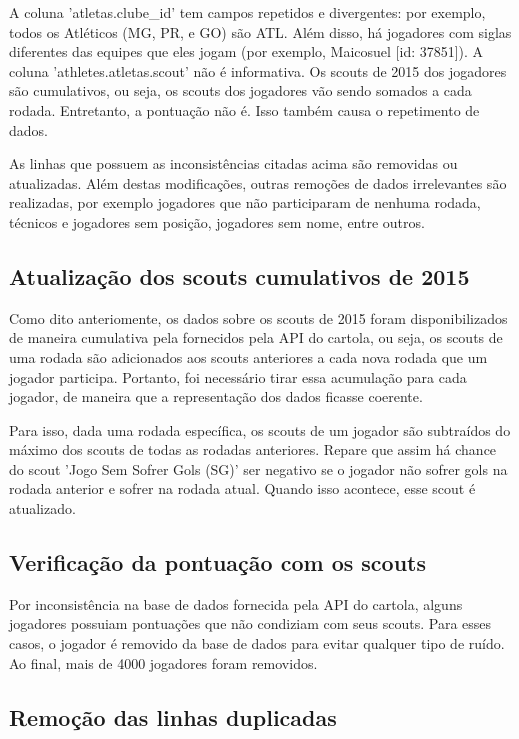\documentclass[conference]{IEEEtran}
\begin{document}
A coluna  'atletas.clube\_id' tem campos repetidos  e divergentes: por
exemplo, todos os Atléticos (MG, PR, e GO) são ATL. Além disso, há
jogadores  com  siglas diferentes  das  equipes  que eles  jogam  (por
exemplo,  Maicosuel [id:  37851]).  A coluna  'athletes.atletas.scout'
não é informativa. Os scouts de 2015 dos jogadores são cumulativos,
ou seja,  os scouts dos  jogadores vão  sendo somados a  cada rodada.
Entretanto, a pontuação não é. Isso também causa o repetimento de
dados.

As linhas que possuem as inconsistências citadas acima são removidas
ou  atualizadas. Além  destas  modificações,  outras remoções  de
dados  irrelevantes são  realizadas, por  exemplo jogadores  que não
participaram de  nenhuma rodada, técnicos e  jogadores sem posição,
jogadores sem nome, entre outros.

\subsection{Atualização dos scouts cumulativos de 2015}

Como  dito  anteriomente, os  dados  sobre  os  scouts de  2015  foram
disponibilizados  de maneira  cumulativa pela  fornecidos pela  API do
cartola, ou seja, os scouts de  uma rodada são adicionados aos scouts
anteriores a cada nova rodada  que um jogador participa. Portanto, foi
necessário tirar essa acumulação para  cada jogador, de maneira que
a representação dos dados ficasse coerente.

Para isso, dada  uma rodada específica, os scouts de  um jogador são
subtraídos  do máximo  dos scouts  de todas  as rodadas  anteriores.
Repare que assim  há chance do scout 'Jogo Sem  Sofrer Gols (SG)' ser
negativo se o jogador não sofrer  gols na rodada anterior e sofrer na
rodada atual. Quando isso acontece, esse scout é atualizado.

\subsection{Verificação da pontuação com os scouts}

Por inconsistência  na base de  dados fornecida pela API  do cartola,
alguns  jogadores possuiam  pontuações que  não condiziam  com seus
scouts. Para esses casos, o jogador  é removido da base de dados para
evitar qualquer tipo de ruído. Ao final, mais de 4000 jogadores foram
removidos.

\subsection{Remoção das linhas duplicadas}
\end{document}

